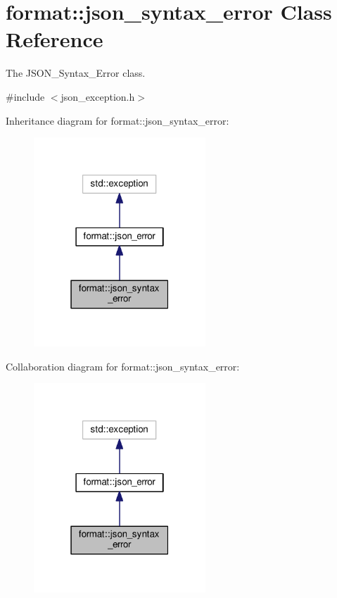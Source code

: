 \hypertarget{classformat_1_1json__syntax__error}{}\section{format\+:\+:json\+\_\+syntax\+\_\+error Class Reference}
\label{classformat_1_1json__syntax__error}


The J\+S\+O\+N\+\_\+\+Syntax\+\_\+\+Error class.  




{\ttfamily \#include $<$json\+\_\+exception.\+h$>$}



Inheritance diagram for format\+:\+:json\+\_\+syntax\+\_\+error\+:
\nopagebreak
\begin{figure}[H]
\begin{center}
\leavevmode
\includegraphics[width=183pt]{classformat_1_1json__syntax__error__inherit__graph}
\end{center}
\end{figure}


Collaboration diagram for format\+:\+:json\+\_\+syntax\+\_\+error\+:
\nopagebreak
\begin{figure}[H]
\begin{center}
\leavevmode
\includegraphics[width=183pt]{classformat_1_1json__syntax__error__coll__graph}
\end{center}
\end{figure}
